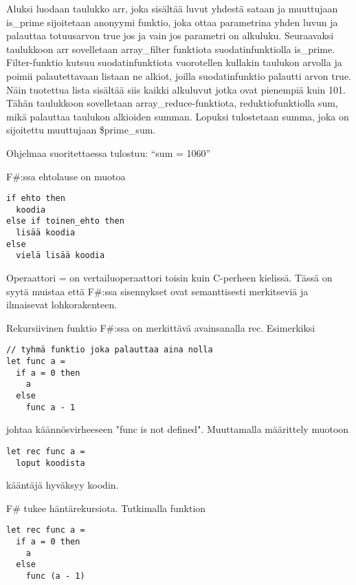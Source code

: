 Aluksi luodaan taulukko arr, joka sisältää luvut yhdestä sataan ja muuttujaan is\_prime sijoitetaan anonyymi funktio, joka ottaa parametrina yhden luvun ja palauttaa totuusarvon true jos ja vain jos parametri on alkuluku. Seuraavaksi taulukkoon arr sovelletaan array\_filter funktiota suodatinfunktiolla is\_prime. Filter-funktio kutsuu suodatinfunktiota vuorotellen kullakin taulukon arvolla ja poimii palautettavaan listaan ne alkiot, joilla suodatinfunktio palautti arvon true. Näin tuotettua lista sisältää siis kaikki alkuluvut jotka ovat pienempiä kuin 101. Tähän taulukkoon sovelletaan array\_reduce-funktiota, reduktiofunktiolla sum, mikä palauttaa taulukon alkioiden summan. Lopuksi tulostetaan summa, joka on sijoitettu muuttujaan \$prime\_sum. 
\par
Ohjelmaa suoritettaessa tulostuu: “sum = 1060” 

\par

F\#:ssa ehtolause on muotoa

\lstset{
	language=FSharp,
	basicstyle=\ttfamily,
	breaklines=true,
	columns=fullflexible
}

\begin{lstlisting}
if ehto then
  koodia
else if toinen_ehto then
  lisää koodia
else
  vielä lisää koodia
\end{lstlisting}

Operaattori = on vertailuoperaattori toisin kuin C-perheen kielissä. Tässä on syytä muistaa että F\#:ssa sisennykset ovat semanttisesti merkitseviä ja ilmaisevat lohkorakenteen.
\par
Rekursiivinen funktio F\#:ssa on merkittävä avainsanalla rec. Esimerkiksi

\begin{lstlisting}
// tyhmä funktio joka palauttaa aina nolla
let func a =
  if a = 0 then
    a
  else
    func a - 1
\end{lstlisting}

johtaa käännösvirheeseen "func is not defined". Muuttamalla määrittely muotoon

\begin{lstlisting}
let rec func a =
  loput koodista
\end{lstlisting} 
 
kääntäjä hyväksyy koodin.

\par

F\# tukee häntärekursiota. Tutkimalla funktion

\begin{lstlisting}
let rec func a =
  if a = 0 then
    a
  else
    func (a - 1)
\end{lstlisting}
    
